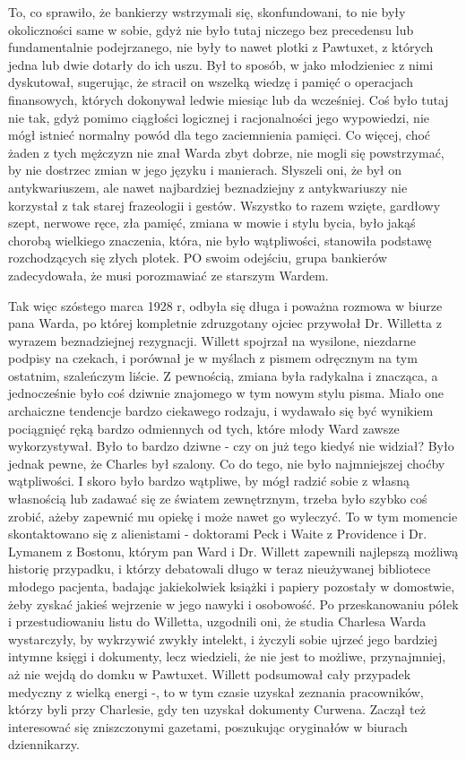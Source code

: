 To, co sprawiło, że bankierzy wstrzymali się, skonfundowani, to nie były okoliczności same w sobie, gdyż nie było tutaj niczego bez precedensu lub fundamentalnie podejrzanego, nie były to nawet plotki z Pawtuxet, z których jedna lub dwie dotarły do ich uszu. Był to sposób, w jako młodzieniec z nimi dyskutował, sugerując, że stracił on wszelką wiedzę i pamięć o operacjach finansowych, których dokonywał ledwie miesiąc lub da wcześniej. Coś było tutaj nie tak, gdyż pomimo ciągłości logicznej i racjonalności jego wypowiedzi, nie mógł istnieć normalny powód dla tego zaciemnienia pamięci. Co więcej, choć żaden z tych mężczyzn nie znał Warda zbyt dobrze, nie mogli się powstrzymać, by nie dostrzec zmian w jego języku i manierach. Słyszeli oni, że był on antykwariuszem, ale nawet najbardziej beznadziejny z antykwariuszy nie korzystał z tak starej frazeologii i gestów. Wszystko to razem wzięte, gardłowy szept, nerwowe ręce, zła pamięć, zmiana w mowie i stylu bycia, było jakąś chorobą wielkiego znaczenia, która, nie było wątpliwości, stanowiła podstawę rozchodzących się złych plotek. PO swoim odejściu, grupa bankierów zadecydowała, że musi porozmawiać ze starszym Wardem. 

Tak więc szóstego marca 1928 r, odbyła się długa i poważna rozmowa w biurze pana Warda, po której kompletnie zdruzgotany ojciec przywołał Dr. Willetta z wyrazem beznadziejnej rezygnacji. Willett spojrzał na wysilone, niezdarne podpisy na czekach, i porównał je w myślach z pismem odręcznym na tym ostatnim, szaleńczym liście. Z pewnością, zmiana była radykalna i znacząca, a jednocześnie było coś dziwnie znajomego w tym nowym stylu pisma. Miało one archaiczne tendencje bardzo ciekawego rodzaju, i wydawało się być wynikiem pociągnięć ręką bardzo odmiennych od tych, które młody Ward zawsze wykorzystywał. Było to bardzo dziwne - czy on już tego kiedyś nie widział? Było jednak pewne, że Charles był szalony. Co do tego, nie było najmniejszej choćby wątpliwości. I skoro było bardzo wątpliwe, by mógł radzić sobie z własną własnością lub zadawać się ze światem zewnętrznym, trzeba było szybko coś zrobić, ażeby zapewnić mu opiekę i może nawet go wyleczyć. To w tym momencie skontaktowano się z alienistami - doktorami Peck i Waite z Providence i Dr. Lymanem z Bostonu, którym pan Ward i Dr. Willett zapewnili najlepszą możliwą historię przypadku, i którzy debatowali długo w teraz nieużywanej bibliotece młodego pacjenta, badając jakiekolwiek książki i papiery pozostały w domostwie, żeby zyskać jakieś wejrzenie w jego nawyki i osobowość. Po przeskanowaniu półek i przestudiowaniu listu do Willetta, uzgodnili oni, że studia Charlesa Warda wystarczyły, by wykrzywić zwykły intelekt, i życzyli sobie ujrzeć jego bardziej intymne księgi i dokumenty, lecz wiedzieli, że nie jest to możliwe, przynajmniej, aż nie wejdą do domku w Pawtuxet. Willett podsumował cały przypadek medyczny z wielką energi -, to w tym czasie uzyskał zeznania pracowników, którzy byli przy Charlesie, gdy ten uzyskał dokumenty Curwena. Zaczął też interesować się zniszczonymi gazetami, poszukując oryginałów w biurach dziennikarzy.  

